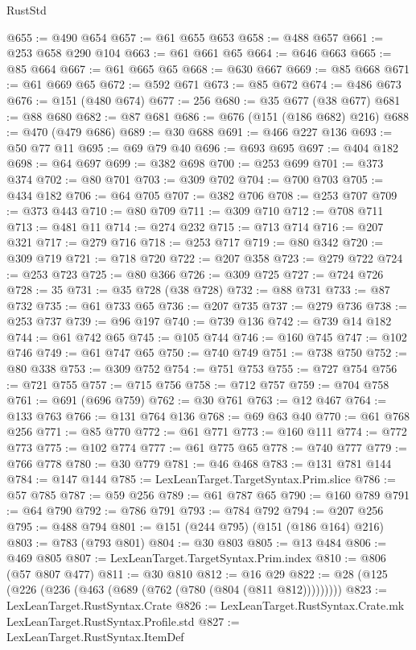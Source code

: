 \begin{lexlean}{RustStd}
\begin{coremodule}
@655 := @490 @654
@657 := @61 @655 @653
@658 := @488 @657
@661 := @253 @658 @290 @104
@663 := @61 @661 @65
@664 := @646 @663
@665 := @85 @664
@667 := @61 @665 @65
@668 := @630 @667
@669 := @85 @668
@671 := @61 @669 @65
@672 := @592 @671
@673 := @85 @672
@674 := @486 @673
@676 := @151 (@480 @674)
@677 := 256
@680 := @35 @677 (@38 @677)
@681 := @88 @680
@682 := @87 @681
@686 := @676 (@151 (@186 @682) @216)
@688 := @470 (@479 @686)
@689 := @30 @688
@691 := @466 @227 @136
@693 := @50 @77 @11
@695 := @69 @79 @40
@696 := @693 @695
@697 := @404 @182
@698 := @64 @697
@699 := @382 @698
@700 := @253 @699
@701 := @373 @374
@702 := @80 @701
@703 := @309 @702
@704 := @700 @703
@705 := @434 @182
@706 := @64 @705
@707 := @382 @706
@708 := @253 @707
@709 := @373 @443
@710 := @80 @709
@711 := @309 @710
@712 := @708 @711
@713 := @481 @11
@714 := @274 @232
@715 := @713 @714
@716 := @207 @321
@717 := @279 @716
@718 := @253 @717
@719 := @80 @342
@720 := @309 @719
@721 := @718 @720
@722 := @207 @358
@723 := @279 @722
@724 := @253 @723
@725 := @80 @366
@726 := @309 @725
@727 := @724 @726
@728 := 35
@731 := @35 @728 (@38 @728)
@732 := @88 @731
@733 := @87 @732
@735 := @61 @733 @65
@736 := @207 @735
@737 := @279 @736
@738 := @253 @737
@739 := @96 @197
@740 := @739 @136
@742 := @739 @14 @182
@744 := @61 @742 @65
@745 := @105 @744
@746 := @160 @745
@747 := @102 @746
@749 := @61 @747 @65
@750 := @740 @749
@751 := @738 @750
@752 := @80 @338
@753 := @309 @752
@754 := @751 @753
@755 := @727 @754
@756 := @721 @755
@757 := @715 @756
@758 := @712 @757
@759 := @704 @758
@761 := @691 (@696 @759)
@762 := @30 @761
@763 := @12 @467
@764 := @133 @763
@766 := @131 @764 @136
@768 := @69 @63 @40
@770 := @61 @768 @256
@771 := @85 @770
@772 := @61 @771
@773 := @160 @111
@774 := @772 @773
@775 := @102 @774
@777 := @61 @775 @65
@778 := @740 @777
@779 := @766 @778
@780 := @30 @779
@781 := @46 @468
@783 := @131 @781 @144
@784 := @147 @144
@785 := LexLeanTarget.TargetSyntax.Prim.slice
@786 := @57 @785
@787 := @59 @256
@789 := @61 @787 @65
@790 := @160 @789
@791 := @64 @790
@792 := @786 @791
@793 := @784 @792
@794 := @207 @256
@795 := @488 @794
@801 := @151 (@244 @795) (@151 (@186 @164) @216)
@803 := @783 (@793 @801)
@804 := @30 @803
@805 := @13 @484
@806 := @469 @805
@807 := LexLeanTarget.TargetSyntax.Prim.index
@810 := @806 (@57 @807 @477)
@811 := @30 @810
@812 := @16 @29
@822 := @28 (@125 (@226 (@236 (@463 (@689 (@762 (@780 (@804 (@811 @812)))))))))
@823 := LexLeanTarget.RustSyntax.Crate
@826 := LexLeanTarget.RustSyntax.Crate.mk LexLeanTarget.RustSyntax.Profile.std
@827 := LexLeanTarget.RustSyntax.ItemDef

\end{coremodule}
\end{lexlean}
